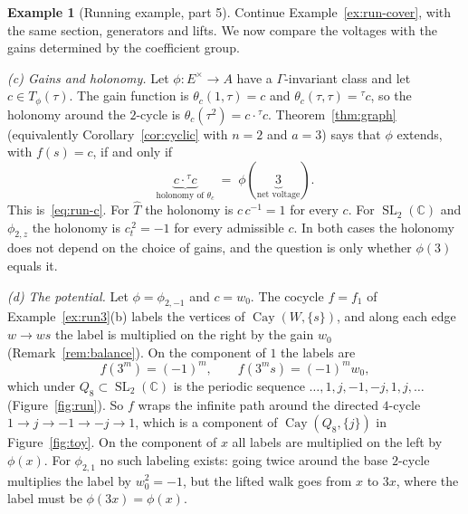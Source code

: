\documentclass[12pt,letterpaper]{article}
\numberwithin{equation}{section}
\theoremstyle{plain}
\theoremstyle{definition}
\newtheorem{example}[theorem]{Example}
\newcommand{\C}{\mathbb{C}}
\newcommand{\Th}{\widehat{T}}
\newcommand{\act}[2]{{}^{#1}\!#2}          %
\DeclareMathOperator{\Cay}{Cay}
\DeclareMathOperator{\SL}{SL}
\begin{document}
\begin{example}[Running example, part 5]\label{ex:run4}
Continue Example~\ref{ex:run-cover}, with the same section, generators and lifts. We now compare the voltages with the gains determined by the coefficient group.

\smallskip\noindent\emph{(c) Gains and holonomy.} Let
$\phi:E^\times\to A$ have a $\Gamma$-invariant class and let
$c\in T_\phi(\tau)$. The gain function is $\theta_c(1,\tau)=c$ and
$\theta_c(\tau,\tau)=\act{\tau}{c}$, so the holonomy around the $2$-cycle
is $\theta_c(\tau^2)=c\cdot\act{\tau}{c}$. Theorem~\ref{thm:graph}
(equivalently Corollary~\ref{cor:cyclic} with $n=2$ and $a=3$) says that
$\phi$ extends, with $f(s)=c$, if and only if
\[
\underbrace{c\cdot\act{\tau}{c}}_{\text{holonomy of }\theta_c}
\;=\;\phi(\underbrace{3}_{\text{net voltage}}).
\]
This is~\eqref{eq:run-c}. For $\Th$ the holonomy is $c\,c^{-1}=1$ for
every $c$. For $\SL_2(\C)$ and $\phi_{2,z}$ the holonomy is
$c_t^{\,2}=-1$ for every admissible $c$. In both cases the holonomy does
not depend on the choice of gains, and the question is only whether
$\phi(3)$ equals it.

\smallskip\noindent\emph{(d) The potential.} Let $\phi=\phi_{2,-1}$ and
$c=w_0$. The cocycle $f=f_1$ of Example~\ref{ex:run3}(b) labels the
vertices of $\Cay(W,\{s\})$, and along each edge $w\to ws$ the label is
multiplied on the right by the gain $w_0$
(Remark~\ref{rem:balance}). On the component of $1$ the labels are
\[
f(3^m)=(-1)^m,\qquad f(3^ms)=(-1)^mw_0 ,
\]
which under $Q_8\subset\SL_2(\C)$ is the periodic sequence
$\dots,1,j,-1,-j,1,j,\dots$ (Figure~\ref{fig:run}). So $f$ wraps the
infinite path around the directed $4$-cycle $1\to j\to-1\to-j\to1$, which
is a component of $\Cay(Q_8,\{j\})$ in Figure~\ref{fig:toy}. On the
component of $x$ all labels are multiplied on the left by $\phi(x)$. For
$\phi_{2,1}$ no such labeling exists: going twice around the base
$2$-cycle multiplies the label by $w_0^2=-1$, but the lifted walk goes
from $x$ to $3x$, where the label must be $\phi(3x)=\phi(x)$.
\end{example}
\end{document}
